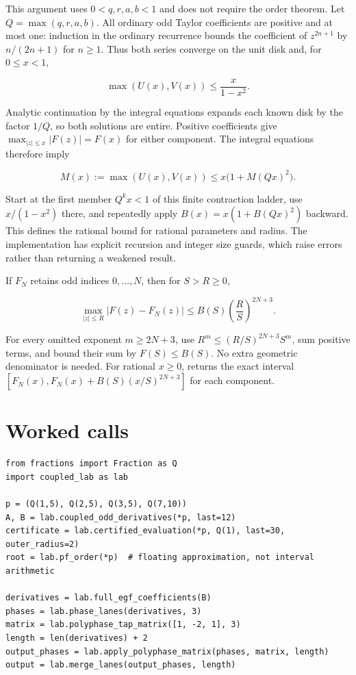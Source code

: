 This argument uses \(0<q,r,a,b<1\) and does not require the order
theorem. Let \(Q=\max(q,r,a,b)\). All ordinary odd Taylor coefficients
are positive and at most one: induction in the ordinary recurrence
bounds the coefficient of \(z^{2n+1}\) by \(n/(2n+1)\) for \(n\ge1\).
Thus both series converge on the unit disk and, for \(0\le x<1\),

\[
\max(U(x),V(x))\le \frac{x}{1-x^2}.
\]

Analytic continuation by the integral equations expands each known disk
by the factor \(1/Q\), so both solutions are entire. Positive
coefficients give \(\max_{|z|\le x}|F(z)|=F(x)\) for either component.
The integral equations therefore imply

\[
M(x):=\max(U(x),V(x))\le x\bigl(1+M(Qx)^2\bigr).
\]

Start at the first member \(Q^kx<1\) of this finite contraction ladder,
use \(x/(1-x^2)\) there, and repeatedly apply \(B(x)=x(1+B(Qx)^2)\)
backward. This defines the rational  bound for
rational parameters and radius. The implementation has explicit
recursion and integer size guards, which raise errors rather than
returning a weakened result.

If \(F_N\) retains odd indices \(0,\ldots,N\), then for \(S>R\ge0\),

\[
\max_{|z|\le R}|F(z)-F_N(z)|
\le B(S)\left(\frac RS\right)^{2N+3}.
\]

For every omitted exponent \(m\ge2N+3\), use \(R^m\le (R/S)^{2N+3}S^m\),
sum positive terms, and bound their sum by \(F(S)\le B(S)\). No extra
geometric denominator is needed. For rational \(x\ge0\),
 returns the exact interval
\([F_N(x),F_N(x)+B(S)(x/S)^{2N+3}]\) for each component.

\hypertarget{v11-coupled_lab_full-worked-calls}{%
\section{Worked calls}\label{v11-coupled_lab_full-worked-calls}}

\begin{verbatim}
from fractions import Fraction as Q
import coupled_lab as lab

p = (Q(1,5), Q(2,5), Q(3,5), Q(7,10))
A, B = lab.coupled_odd_derivatives(*p, last=12)
certificate = lab.certified_evaluation(*p, Q(1), last=30, outer_radius=2)
root = lab.pf_order(*p)  # floating approximation, not interval arithmetic

derivatives = lab.full_egf_coefficients(B)
phases = lab.phase_lanes(derivatives, 3)
matrix = lab.polyphase_tap_matrix([1, -2, 1], 3)
length = len(derivatives) + 2
output_phases = lab.apply_polyphase_matrix(phases, matrix, length)
output = lab.merge_lanes(output_phases, length)
\end{verbatim}

